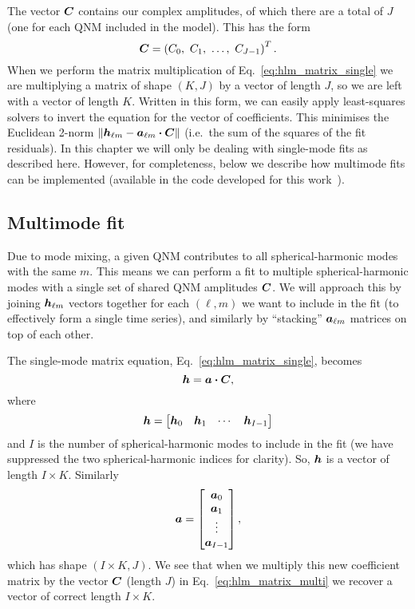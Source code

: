 The vector $\vb*{C}$ contains our complex amplitudes, of which there are a total of $J$ (one for each QNM included in the model). This has the form
\begin{equation}
    \vb*{C} = \left(C_0,\ C_1,\ \ldots,\ C_{J-1}\right)^T.
\end{equation}
When we perform the matrix multiplication of Eq.~\ref{eq:hlm_matrix_single} we are multiplying a matrix of shape $(K,J)$ by a vector of length $J$, so we are left with a vector of length $K$.
Written in this form, we can easily apply least-squares solvers to invert the equation for the vector of coefficients. 
This minimises the Euclidean 2-norm $\norm{\vb*{h}_{\ell m} - \vb*{a}_{\ell m} \vdot \vb*{C}}$ (i.e.\ the sum of the squares of the fit residuals).
In this chapter we will only be dealing with single-mode fits as described here.
However, for completeness, below we describe how multimode fits can be implemented (available in the code developed for this work~\cite{qnmfits}).

\subsection{Multimode fit}

Due to mode mixing, a given QNM contributes to all spherical-harmonic modes with the same $m$. 
This means we can perform a fit to multiple spherical-harmonic modes with a single set of shared QNM amplitudes $\vb*{C}$.
We will approach this by joining $\vb*{h}_{\ell m}$ vectors together for each $(\ell, m)$ we want to include in the fit (to effectively form a single time series), and similarly by ``stacking'' $\vb*{a}_{\ell m}$ matrices on top of each other.

The single-mode matrix equation, Eq.~\ref{eq:hlm_matrix_single}, becomes
\begin{equation}\label{eq:hlm_matrix_multi}
    \vb*{h} = \vb*{a} \vdot \vb*{C},
\end{equation}
where
\begin{equation}
    \vb*{h} = 
    \begin{bmatrix}
    \vb*{h}_0 & \vb*{h}_1 & \cdots & \vb*{h}_{I-1}
    \end{bmatrix}
\end{equation}
and $I$ is the number of spherical-harmonic modes to include in the fit (we have suppressed the two spherical-harmonic indices for clarity). So, $\vb*{h}$ is a vector of length $I \times K$.
Similarly
\begin{equation}
    \vb*{a} = 
    \begin{bmatrix}
    \vb*{a}_0 \\ \vb*{a}_1 \\ \vdots \\ \vb*{a}_{I-1}
    \end{bmatrix},
\end{equation}
which has shape $(I \times K, J)$. 
We see that when we multiply this new coefficient matrix by the vector $\vb*{C}$ (length $J$) in Eq.~\ref{eq:hlm_matrix_multi} we recover a vector of correct length $I \times K$.

